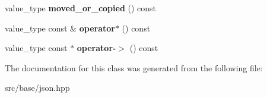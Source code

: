 \begin{DoxyCompactItemize}
\mbox{\label{classnlohmann_1_1detail_1_1json__ref_ae39e523218bf05cac3fb5b5b1cd5efb6}} 
value\+\_\+type {\bfseries moved\+\_\+or\+\_\+copied} () const
\item 
\mbox{\label{classnlohmann_1_1detail_1_1json__ref_aa3100e41472dba02ab78ccc1607e44ab}} 
value\+\_\+type const  \& {\bfseries operator$\ast$} () const
\item 
\mbox{\label{classnlohmann_1_1detail_1_1json__ref_adb652774a67829876449dc0b30637456}} 
value\+\_\+type const  $\ast$ {\bfseries operator-\/$>$} () const
\end{DoxyCompactItemize}


The documentation for this class was generated from the following file\+:\begin{DoxyCompactItemize}
\item 
src/base/json.\+hpp\end{DoxyCompactItemize}
